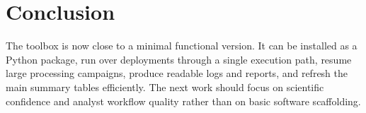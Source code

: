 \documentclass[11pt,a4paper]{article}
\begin{document}
\section{Conclusion}

The toolbox is now close to a minimal functional version. It can be installed as a Python package, run over deployments through a single execution path, resume large processing campaigns, produce readable logs and reports, and refresh the main summary tables efficiently. The next work should focus on scientific confidence and analyst workflow quality rather than on basic software scaffolding.
\end{document}
